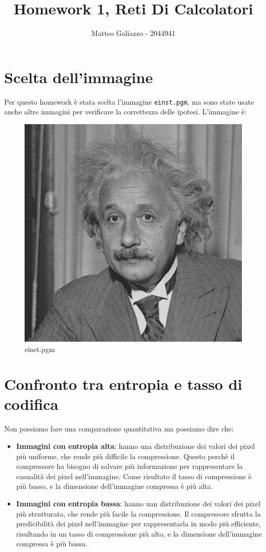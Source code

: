 \documentclass{article}
\title{Homework 1, Reti Di Calcolatori}
\author{Matteo Galiazzo - 2044941}
\begin{document}
\maketitle

\tableofcontents

\section{Scelta dell'immagine}

Per questo homework è stata scelta l'immagine \verb|einst.pgm|, ma sono state usate anche altre immagini per verificare la correttezza delle ipotesi.
L'immagine è:
\begin{figure}[h]
    \centering
    \includegraphics[width=0.4\linewidth]{einst.png}
    \caption{einst.pgm}
    \label{fig:einst_pgm}
\end{figure}

\section{Confronto tra entropia e tasso di codifica}

Non possiamo fare una comparazione quantitativa ma possiamo dire che:
\begin{itemize}
    \item \textbf{Immagini con entropia alta}: hanno una distribuzione dei valori dei pixel più uniforme, che rende più difficile la compressione.
    Questo perchè il compressore ha bisogno di salvare più informazione per rappresentare la casualità dei pixel nell'immagine.
    Come risultato il tasso di compressione è più basso, e la dimensione dell'immagine compressa è più alta.
    
    \item \textbf{Immagini con entropia bassa}: hanno uan distribuzione dei valori dei pixel più strutturata, che rende più facile la compressione.
    Il compressore sfrutta la predicibilità dei pixel nell'immagine per rappresentarla in modo più efficiente, risultando in un tasso di compressione più alto, e la dimensione dell'immagine compressa è più bassa.
\end{itemize}
\end{document}
